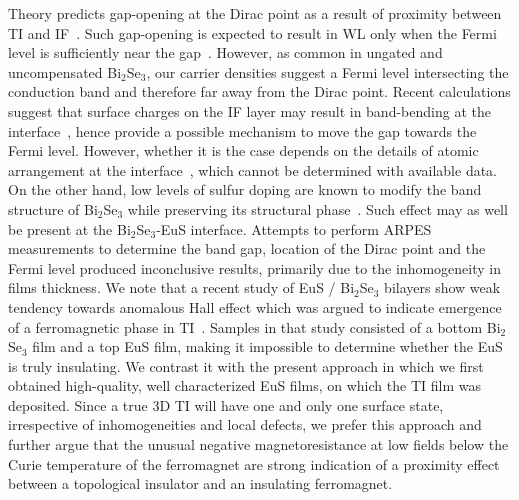 Theory predicts gap-opening at the Dirac point as a result of proximity between TI and IF~\cite{QAH_TI_Yu}. Such gap-opening is expected to result in WL only when the Fermi level is sufficiently near the gap~\cite{WL_WAL_competition, WL_Glazman, WL_bulk_Lu}. However, as common in ungated and uncompensated Bi$_2$Se$_3$, our carrier densities suggest a Fermi level intersecting the conduction band and therefore far away from the Dirac point. Recent calculations suggest that surface charges on the IF layer may result in band-bending at the interface~\cite{MnSe}, hence provide a possible mechanism to move the gap towards the Fermi level. However, whether it is the case depends on the details of atomic arrangement at the interface~\cite{xiaoliang}, which cannot be determined with available data. On the other hand, low levels of sulfur doping are known to modify the band structure of Bi$_2$Se$_3$ while preserving its structural phase~\cite{Bi2Se3S, BiSeS}. Such effect may as well be present at the Bi$_2$Se$_3$-EuS interface. Attempts to perform ARPES measurements to determine the band gap, location of the Dirac point and the Fermi level produced inconclusive results, primarily due to the inhomogeneity in films thickness.  We note that a recent study of EuS / Bi$_2$Se$_3$ bilayers show weak tendency towards anomalous Hall effect which was argued to indicate  emergence of a ferromagnetic phase in TI~\cite{Moodera2013}. Samples in that study consisted of a bottom Bi$_2$Se$_3$ film and a top EuS film, making it impossible to determine whether the EuS is truly insulating. We contrast it with the present approach in which we first obtained high-quality, well characterized EuS films, on which the TI film was deposited. Since a true 3D TI will have one and only one surface state, irrespective of inhomogeneities and local defects, we prefer this approach and further argue that the unusual negative magnetoresistance at low fields below the Curie temperature of the ferromagnet are strong indication of a proximity effect between a topological insulator and an insulating ferromagnet.
